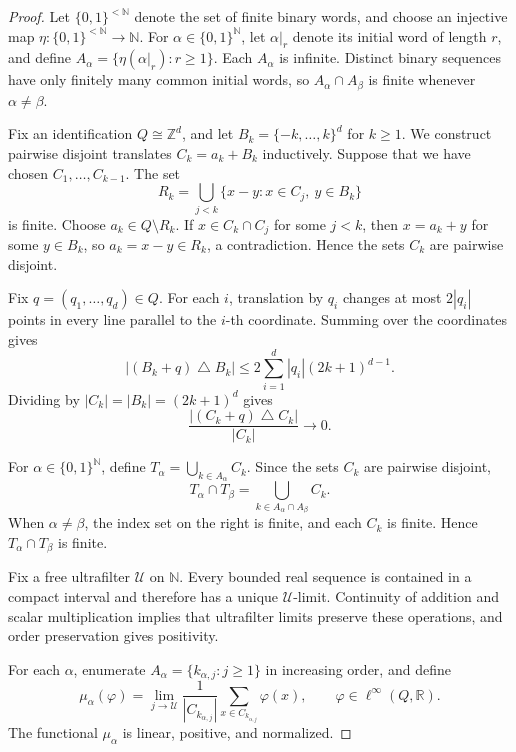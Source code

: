 \documentclass[pdflatex,sn-mathphys-num]{sn-jnl}%
\theoremstyle{plain}
\theoremstyle{remark}
\theoremstyle{definition}
\numberwithin{equation}{section}
\begin{document}
\begin{proof}
Let \( \{0,1\}^{<\mathbb N} \) denote the set of finite binary words, and choose an injective map \( \eta\colon\{0,1\}^{<\mathbb N}\to\mathbb N \). For \( \alpha\in\{0,1\}^{\mathbb N} \), let \( \alpha|_r \) denote its initial word of length \( r \), and define \( A_\alpha=\{\eta(\alpha|_r):r\geq1\} \). Each \( A_\alpha \) is infinite. Distinct binary sequences have only finitely many common initial words, so \( A_\alpha\cap A_\beta \) is finite whenever \( \alpha\neq\beta \).

Fix an identification \( Q\cong\mathbb Z^d \), and let \( B_k=\{-k,\ldots,k\}^d \) for \( k\geq1 \). We construct pairwise disjoint translates \( C_k=a_k+B_k \) inductively. Suppose that we have chosen \( C_1,\ldots,C_{k-1} \). The set
\[
R_k
=
\bigcup_{j<k}
\{x-y:x\in C_j,\ y\in B_k\}
\]
is finite. Choose \( a_k\in Q\setminus R_k \). If \( x\in C_k\cap C_j \) for some \( j<k \), then \( x=a_k+y \) for some \( y\in B_k \), so \( a_k=x-y\in R_k \), a contradiction. Hence the sets \( C_k \) are pairwise disjoint.

Fix \( q=(q_1,\ldots,q_d)\in Q \). For each \( i \), translation by \( q_i \) changes at most \( 2|q_i| \) points in every line parallel to the \( i \)-th coordinate. Summing over the coordinates gives
\[
|(B_k+q)\mathbin{\triangle}B_k|
\leq
2\sum_{i=1}^d
|q_i|(2k+1)^{d-1}.
\]
Dividing by \( |C_k|=|B_k|=(2k+1)^d \) gives
\begin{equation}
\label{eq:folner-cube-estimate}
\frac{|(C_k+q)\mathbin{\triangle}C_k|}{|C_k|}
\longrightarrow
0.
\end{equation}

For \( \alpha\in\{0,1\}^{\mathbb N} \), define \( T_\alpha=\bigcup_{k\in A_\alpha}C_k \). Since the sets \( C_k \) are pairwise disjoint,
\[
T_\alpha\cap T_\beta
=
\bigcup_{k\in A_\alpha\cap A_\beta}C_k.
\]
When \( \alpha\neq\beta \), the index set on the right is finite, and each \( C_k \) is finite. Hence \( T_\alpha\cap T_\beta \) is finite.

Fix a free ultrafilter \( \mathcal U \) on \( \mathbb N \). Every bounded real sequence is contained in a compact interval and therefore has a unique \( \mathcal U \)-limit. Continuity of addition and scalar multiplication implies that ultrafilter limits preserve these operations, and order preservation gives positivity.

For each \( \alpha \), enumerate \( A_\alpha=\{k_{\alpha,j}:j\geq1\} \) in increasing order, and define
\[
\mu_\alpha(\varphi)
=
\lim_{j\to\mathcal U}
\frac{1}{|C_{k_{\alpha,j}}|}
\sum_{x\in C_{k_{\alpha,j}}}
\varphi(x),
\qquad
\varphi\in\ell^\infty(Q,\mathbb R).
\]
The functional \( \mu_\alpha \) is linear, positive, and normalized.


\end{proof}
\end{document}

